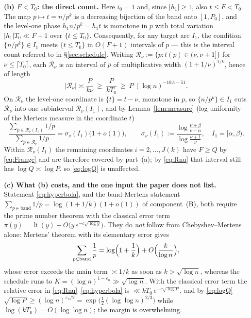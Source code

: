 \documentclass[11pt]{article}
\theoremstyle{definition}
\theoremstyle{plain}
\begin{document}
\smallskip
\noindent\textbf{(b) $F<T_{0}$: the direct count.}  Here $i_{0}=1$ and,
since $|h_{1}|\ge1$, also $t\le F<T_{0}$.  The map $p\mapsto t=n/p^{k}$
is a decreasing bijection of the band onto $[1,P_{0}]$, and the level-one
phase $h_{1}n/p^{k}=h_{1}t$ is monotone in $p$ with total variation
$|h_{1}|T_{0}\ll F+1$ over $\{t\le T_{0}\}$.  Consequently, for any
target arc $I_{1}$, the condition $\{n/p^{k}\}\in I_{1}$ meets
$\{t\le T_{0}\}$ in $O(F+1)$ intervals of $p$ --- this is the interval
count referred to in \S\ref{sec:schedule}.  Writing
$\mathcal R_{\nu}:=\{p:t(p)\in(\nu,\nu+1]\}$ for
$\nu\le\lceil T_{0}\rceil$, each $\mathcal R_{\nu}$ is an interval of $p$
of multiplicative width $(1+1/\nu)^{1/k}$, hence of length
\begin{equation}\label{eq:Rnu}
|\mathcal R_{\nu}|\asymp\frac{P}{k\nu}\ \ge\ \frac{P}{kT_{0}}
\ \ge\ P\,(\log n)^{-10A-51}.
\end{equation}
On $\mathcal R_{\nu}$ the level-one coordinate is $\{t\}=t-\nu$, monotone
in $p$, so $\{n/p^{k}\}\in I_{1}$ cuts $\mathcal R_{\nu}$ into one
subinterval $\mathcal R_{\nu}(I_{1})$, and by Lemma~\ref{lem:measure}
(log-uniformity of the Mertens measure in the coordinate $t$)
\begin{equation}\label{eq:hyperbola}
\frac{\sum_{p\in\mathcal R_{\nu}(I_{1})}1/p}
{\sum_{p\in\mathcal R_{\nu}}1/p}
=\sigma_{\nu}(I_{1})\bigl(1+o(1)\bigr),
\qquad
\sigma_{\nu}(I_{1}):=\frac{\log\frac{\nu+\beta}{\nu+\alpha}}
{\log\frac{\nu+1}{\nu}},\quad I_{1}=[\alpha,\beta).
\end{equation}
Within $\mathcal R_{\nu}(I_{1})$ the remaining coordinates
$i=2,\dots,J(k)$ have $F\ge Q$ by \eqref{eq:Frange} and are therefore
covered by part~(a); by \eqref{eq:Rnu} that interval still has
$\log Q\asymp\log P$, so \eqref{eq:logQ} is unaffected.

\smallskip
\noindent\textbf{(c) What (b) costs, and the one input the paper does not
list.}  Statement \eqref{eq:hyperbola}, and the band-Mertens statement
$\sum_{p\in\text{band}}1/p=\log(1+1/k)(1+o(1))$ of component~(B), both
require the prime number theorem with the classical error term
$\pi(y)=\operatorname{li}(y)+O\bigl(y\,e^{-c\sqrt{\log y}}\bigr)$.  They
do \emph{not} follow from Chebyshev--Mertens alone: Mertens' theorem with
its elementary error gives
\[
\sum_{p\in\text{band}}\frac1p=\log\Bigl(1+\frac1k\Bigr)
+O\Bigl(\frac{k}{\log n}\Bigr),
\]
whose error exceeds the main term $\asymp1/k$ as soon as
$k>\sqrt{\log n}$, whereas the schedule runs to
$K=(\log n)^{1-\varepsilon_{n}}\gg\sqrt{\log n}$.  With the classical
error term the relative error in \eqref{eq:Rnu}--\eqref{eq:hyperbola} is
$\ll kT_{0}\,e^{-c\sqrt{\log P}}$, and by \eqref{eq:logQ}
$\sqrt{\log P}\ge(\log n)^{\varepsilon_{n}/2}
=\exp\bigl(\tfrac12(\log\log n)^{2/3}\bigr)$ while
$\log(kT_{0})=O(\log\log n)$; the margin is overwhelming.
\end{document}
